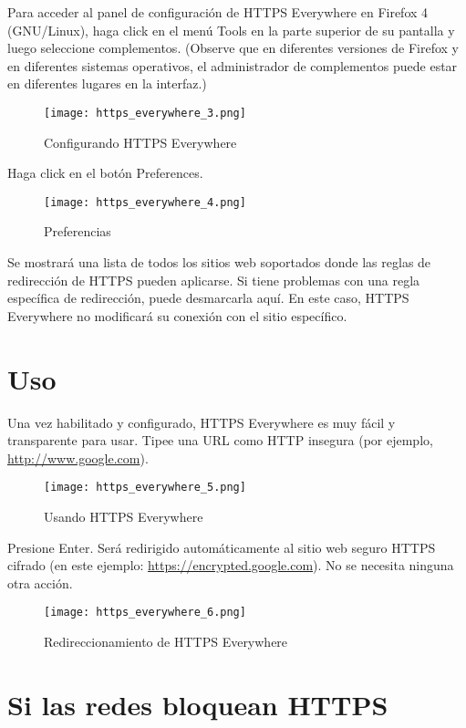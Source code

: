 \documentclass[10pt,a5paper,twoside,,]{book}
\begin{document}
Para acceder al panel de configuración de HTTPS Everywhere en Firefox 4
(GNU/Linux), haga click en el menú Tools en la parte superior de su
pantalla y luego seleccione complementos. (Observe que en diferentes
versiones de Firefox y en diferentes sistemas operativos, el
administrador de complementos puede estar en diferentes lugares en la
interfaz.)

\begin{figure}[htbp]
\centering
\texttt{[image: https\_everywhere\_3.png]}
\caption{Configurando HTTPS Everywhere}
\end{figure}

Haga click en el botón Preferences.

\begin{figure}[htbp]
\centering
\texttt{[image: https\_everywhere\_4.png]}
\caption{Preferencias}
\end{figure}

Se mostrará una lista de todos los sitios web soportados donde las
reglas de redirección de HTTPS pueden aplicarse. Si tiene problemas con
una regla específica de redirección, puede desmarcarla aquí. En este
caso, HTTPS Everywhere no modificará su conexión con el sitio
específico.

\section{Uso}\label{uso}

Una vez habilitado y configurado, HTTPS Everywhere es muy fácil y
transparente para usar. Tipee una URL como HTTP insegura (por ejemplo,
\url{http://www.google.com}).

\begin{figure}[htbp]
\centering
\texttt{[image: https\_everywhere\_5.png]}
\caption{Usando HTTPS Everywhere}
\end{figure}

Presione Enter. Será redirigido automáticamente al sitio web seguro
HTTPS cifrado (en este ejemplo: \url{https://encrypted.google.com}). No
se necesita ninguna otra acción.

\begin{figure}[htbp]
\centering
\texttt{[image: https\_everywhere\_6.png]}
\caption{Redireccionamiento de HTTPS Everywhere}
\end{figure}

\section{Si las redes bloquean HTTPS}\label{si-las-redes-bloquean-https}
\end{document}
